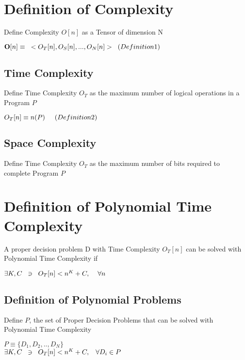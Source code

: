 \documentclass[11pt]{article}
\begin{document}
\section{Definition of Complexity}
Define Complexity $O[n]$ as a Tensor of dimension N
\begin{center}
$
\bold{O}[n] \equiv \hspace{3mm} < O_T [n], O_S [n],...,O_N[n]> \hspace{2mm} (Definition 1)
$
\end{center}

\subsection{Time Complexity}
Define Time Complexity $O_T$ as the maximum number of logical operations in a Program $P$
\begin{center}
$
O_T[n] \equiv n(P) \hspace{5mm} (Definition 2)
$
\end{center}

\subsection{Space Complexity}
Define Time Complexity $O_T$ as the maximum number of bits required to complete Program $P$





\section{Definition of Polynomial Time Complexity}
A proper decision problem D with Time Complexity $O_T[n]$ can be solved with Polynomial Time Complexity if
\begin{center}
$
\exists K,C \hspace{2mm} \ni \hspace{2mm} O_T[n] < n^K + C, \hspace{4mm} \forall n
$
\end{center}




\subsection{Definition of Polynomial Problems}
Define $P$, the set of Proper Decision Problems that can be solved with Polynomial Time Complexity
\begin{center}
$
P \equiv \{ D_1,D_2,..,D_N \} 
$\\
$ 
\exists K,C\hspace{2mm} \ni \hspace{2mm} O_T[n] < n^K + C, \hspace{3mm} \forall D_i \in P
$
\end{center}
\end{document}
